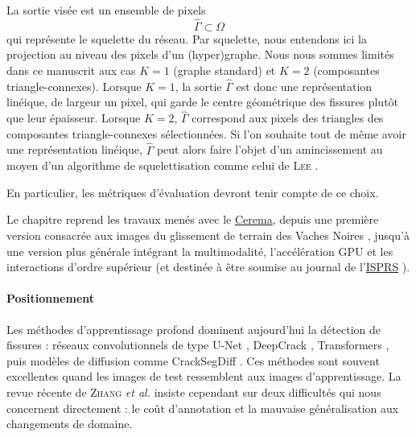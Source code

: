 La sortie visée est un ensemble de pixels
\[
    \widehat\Gamma \subset \Omega
\]
qui représente le squelette du réseau. Par squelette, nous entendons ici  la projection au niveau des pixels d'un (hyper)graphe. Nous nous sommes limités dans ce manuscrit aux cas $K=1$ (graphe standard) et $K=2$ (composantes triangle-connexes).
Lorsque $K=1$, la sortie $\widehat \Gamma$ est donc une représentation linéique, de largeur un pixel, qui garde le centre géométrique des fissures plutôt que leur épaisseur. 
Lorsque $K=2$, $\widehat \Gamma$ correspond aux pixels des triangles des composantes triangle-connexes sélectionnées. Si l'on souhaite tout de même avoir une représentation linéique, $\widehat \Gamma$ peut alors faire l'objet d'un amincissement au moyen d'un algorithme de squelettisation comme celui de \textsc{Lee} \cite{Lee1994, SciKitSkeletonization}. %


En particulier, les métriques d'évaluation devront tenir compte de ce choix. %

Le chapitre reprend les travaux menés avec le \href{https://www.cerema.fr/fr/mots-cles/equipe-recherche-endsum}{Cerema}, depuis une première version consacrée aux images du glissement de terrain des Vaches Noires \cite{BibiStrasbourg}, jusqu'à une version plus générale intégrant la multimodalité, l'accélération GPU et les interactions d'ordre supérieur (et destinée à être soumise au journal de l'\href{https://www.sciencedirect.com/journal/isprs-journal-of-photogrammetry-and-remote-sensing}{ISPRS} \cite{BibiISPRS}).

\paragraph{Positionnement}
Les méthodes d'apprentissage profond dominent aujourd'hui la détection de fissures : réseaux convolutionnels de type U-Net \cite{Unet2015}, DeepCrack \cite{DeepCrack2019}, Transformers \cite{CrackFormer2021}, puis modèles de diffusion comme CrackSegDiff \cite{CrackSegDiff2024}. Ces méthodes sont souvent excellentes quand les images de test ressemblent aux images d'apprentissage. La revue récente de \textsc{Zhang} \emph{et al.} \cite{Zhang2025Review} insiste cependant sur deux difficultés qui nous concernent directement : le coût d'annotation et la mauvaise généralisation aux changements de domaine. %

